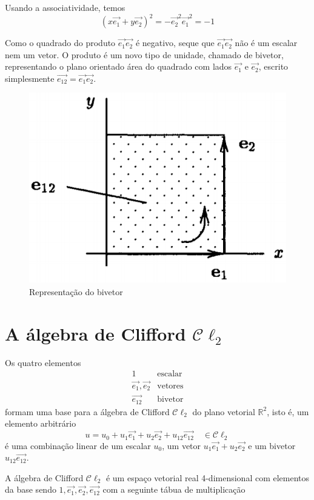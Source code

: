 \documentclass[12pt, oneside, a4paper, english, brazil]{abntex2}
\providecommand{\p}[1]{\left( #1 \right)}
\providecommand{\Rdois}{\mathbb{R}^2}
\providecommand{\Cldois}{\mathcal{C}\ell_2}
\renewcommand{\vec}{\overrightarrow}
\theoremstyle{normal}
\theoremstyle{observacao}
\begin{document}
Usando a associatividade, temos
\[
\p{x\vec{e_1}+y\vec{e_2}}^2=-\vec{e_2}^2\vec{e_1}^2=-1
\]

Como o quadrado do produto $\vec{e_1}\vec{e_2}$ é negativo, seque que $\vec{e_1}\vec{e_2}$ não é um escalar nem um vetor. O produto é um novo tipo de unidade, chamado de bivetor, representando o plano orientado área do quadrado com lados $\vec{e_1}$ e $\vec{e_2}$, escrito simplesmente $\vec{e_{12}}=\vec{e_1}\vec{e_2}$.
\newpage
\begin{figure}[h!]
\centering
\includegraphics[scale=0.5]{bivetor}
\caption{Representação do bivetor \cite[p. 9]{lounesto2001}}
\label{bivetor}
\end{figure}

\section{A álgebra de Clifford $\Cldois$}\label{algebracl2}

Os quatro elementos 
\[
\begin{array}{rl}
1 & \text{escalar} \\
\vec{e_1}, \vec{e_2} & \text{vetores} \\
\vec{e_{12}} & \text{bivetor}
\end{array}
\]
formam uma base para a álgebra de Clifford $\Cldois$ do plano vetorial $\Rdois$, isto é, um elemento arbitrário
\[
u = u_0 +u_1 \vec{e_1} + u_2\vec{e_2}+ u_{12}\vec{e_{12}} \quad \in \Cldois
\]
é uma combinação linear de um escalar $u_0$, um vetor $u_1 \vec{e_1} + u_2\vec{e_2}$ e um bivetor $u_{12}\vec{e_{12}}$.

A álgebra de Clifford $\Cldois$ é um espaço vetorial real 4-dimensional com elementos da base sendo $1,\vec{e_1}, \vec{e_2}, \vec{e_{12}}$ com a seguinte tábua de multiplicação
\end{document}
